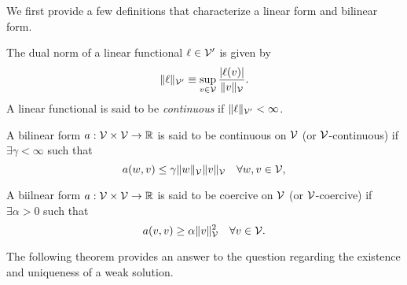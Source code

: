 We first provide a few definitions that characterize a linear form and bilinear form.
\begin{definition}
  The dual norm of a linear functional $\ell \in \mathcal{V}'$ is given by
  \begin{equation*}
    \| \ell \|_{\mathcal{V}'} \equiv \sup_{v \in \mathcal{V}} \frac{|\ell(v)|}{\| v \|_{\mathcal{V}}}.
  \end{equation*}
  A linear functional is said to be \emph{continuous} if $\| \ell \|_{\mathcal{V}'} < \infty$.
\end{definition}
\begin{definition}[continuity]
  \label{def:th_continuity}
  A bilinear form $a: \mathcal{V} \times \mathcal{V} \to \mathbb{R}$ is said to be continuous on $\mathcal{V}$ (or $\mathcal{V}$-continuous) if $\exists \gamma < \infty$ such that 
  \begin{equation*}
    a(w,v) \leq \gamma \| w \|_{\mathcal{V}} \| v \|_{\mathcal{V}} \quad \forall w,v \in \mathcal{V},
  \end{equation*}
\end{definition}
\begin{definition}[coercivity]
  \label{def:th_coercivity}
  A biilnear form $a: \mathcal{V} \times \mathcal{V} \to \mathbb{R}$ is said to be coercive on $\mathcal{V}$ (or $\mathcal{V}$-coercive) if $\exists \alpha > 0$ such that 
  \begin{equation*}
    a(v,v) \geq \alpha \| v \|_{\mathcal{V}}^2 \quad \forall v \in \mathcal{V}.
  \end{equation*}
\end{definition}
The following theorem provides an answer to the question regarding the existence and uniqueness of a weak solution.
